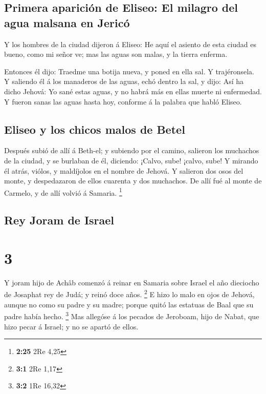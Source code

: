 \hypertarget{primera-apariciuxf3n-de-eliseo-el-milagro-del-agua-malsana-en-jericuxf3}{%
\subsection{Primera aparición de Eliseo: El milagro del agua malsana en
Jericó}\label{primera-apariciuxf3n-de-eliseo-el-milagro-del-agua-malsana-en-jericuxf3}}

 Y los hombres de la ciudad dijeron á Eliseo: He aquí el
asiento de esta ciudad es bueno, como mi señor ve; mas las aguas son
malas, y la tierra enferma.

 Entonces él dijo: Traedme una botija nueva, y poned en
ella sal. Y trajéronsela.  Y saliendo él á los manaderos de
las aguas, echó dentro la sal, y dijo: Así ha dicho Jehová: Yo sané
estas aguas, y no habrá más en ellas muerte ni enfermedad. 
Y fueron sanas las aguas hasta hoy, conforme á la palabra que habló
Eliseo.

\hypertarget{eliseo-y-los-chicos-malos-de-betel}{%
\subsection{Eliseo y los chicos malos de
Betel}\label{eliseo-y-los-chicos-malos-de-betel}}

 Después subió de allí á Beth-el; y subiendo por el camino,
salieron los muchachos de la ciudad, y se burlaban de él, diciendo:
¡Calvo, sube! ¡calvo, sube!  Y mirando él atrás, viólos, y
maldíjolos en el nombre de Jehová. Y salieron dos osos del monte, y
despedazaron de ellos cuarenta y dos muchachos.  De allí
fué al monte de Carmelo, y de allí volvió á Samaria. \footnote{\textbf{2:25}
  2Re 4,25}

\hypertarget{rey-joram-de-israel}{%
\subsection{Rey Joram de Israel}\label{rey-joram-de-israel}}

\hypertarget{section-2}{%
\section{3}\label{section-2}}

 Y joram hijo de Achâb comenzó á reinar en Samaria sobre
Israel el año dieciocho de Josaphat rey de Judá; y reinó doce años.
\footnote{\textbf{3:1} 2Re 1,17}  E hizo lo malo en ojos de
Jehová, aunque no como su padre y su madre; porque quitó las estatuas de
Baal que su padre había hecho. \footnote{\textbf{3:2} 1Re 16,32}
 Mas allegóse á los pecados de Jeroboam, hijo de Nabat, que
hizo pecar á Israel; y no se apartó de ellos.

